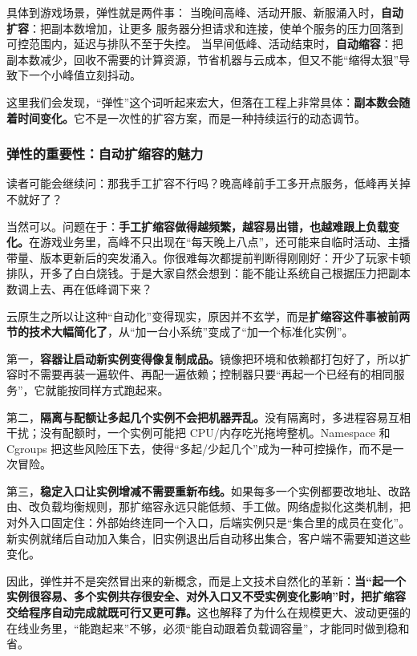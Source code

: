 具体到游戏场景，弹性就是两件事：
当晚间高峰、活动开服、新服涌入时，\textbf{自动扩容}：把副本数增加，让更多 服务器分担请求和连接，使单个服务的压力回落到可控范围内，延迟与排队不至于失控。
当早间低峰、活动结束时，\textbf{自动缩容}：把副本数减少，回收不需要的计算资源，节省机器与云成本，但又不能“缩得太狠”导致下一个小峰值立刻抖动。

这里我们会发现，“弹性”这个词听起来宏大，但落在工程上非常具体：\textbf{副本数会随着时间变化。}它不是一次性的扩容方案，而是一种持续运行的动态调节。

\subsubsection{弹性的重要性：自动扩缩容的魅力}

读者可能会继续问：那我手工扩容不行吗？晚高峰前手工多开点服务，低峰再关掉不就好了？

当然可以。问题在于：\textbf{手工扩缩容做得越频繁，越容易出错，也越难跟上负载变化。}在游戏业务里，高峰不只出现在“每天晚上八点”，还可能来自临时活动、主播带量、版本更新后的突发涌入。你很难每次都提前判断得刚刚好：开少了玩家卡顿排队，开多了白白烧钱。于是大家自然会想到：能不能让系统自己根据压力把副本数调上去、再在低峰调下来？

云原生之所以让这种“自动化”变得现实，原因并不玄学，而是\textbf{扩缩容这件事被前两节的技术大幅简化了}，从“加一台小系统”变成了“加一个标准化实例”。

第一，\textbf{容器让启动新实例变得像复制成品。}镜像把环境和依赖都打包好了，所以扩容时不需要再装一遍软件、再配一遍依赖；控制器只要“再起一个已经有的相同服务”，它就能按同样方式跑起来。

第二，\textbf{隔离与配额让多起几个实例不会把机器弄乱。}没有隔离时，多进程容易互相干扰；没有配额时，一个实例可能把 CPU/内存吃光拖垮整机。Namespace 和 Cgroups 把这些风险压下去，使得“多起/少起几个”成为一种可控操作，而不是一次冒险。

第三，\textbf{稳定入口让实例增减不需要重新布线。}如果每多一个实例都要改地址、改路由、改负载均衡规则，那扩缩容永远只能低频、手工做。网络虚拟化这类机制，把对外入口固定住：外部始终连同一个入口，后端实例只是“集合里的成员在变化”。新实例就绪后自动加入集合，旧实例退出后自动移出集合，客户端不需要知道这些变化。

因此，弹性并不是突然冒出来的新概念，而是上文技术自然化的革新：\textbf{当“起一个实例很容易、多个实例共存很安全、对外入口又不受实例变化影响”时，把扩缩容交给程序自动完成就既可行又更可靠。}这也解释了为什么在规模更大、波动更强的在线业务里，“能跑起来”不够，必须“能自动跟着负载调容量”，才能同时做到稳和省。

